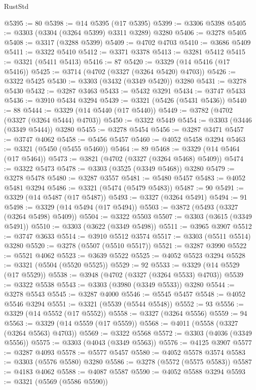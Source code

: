 \begin{lexlean}{RustStd}
\begin{coremodule}
@5395 := 80
@5398 := @14 @5395 (@17 @5395)
@5399 := @3306 @5398
@5405 := @3303 (@3304 (@3264 @5399) @3311 @3289) @3280
@5406 := @3278 @5405
@5408 := @3317 (@3288 @5399)
@5409 := @4702 @4703
@5410 := @3686 @5409
@5411 := @3322 @5410
@5412 := @3371 @3378
@5413 := @3281 @5412
@5415 := @3321 (@5411 @5413)
@5416 := 87
@5420 := @3329 (@14 @5416 (@17 @5416))
@5425 := @3714 (@4702 (@3327 (@3264 @5420) @4703))
@5426 := @3322 @5425
@5430 := @3303 (@3432 (@3349 @5420)) @3280
@5431 := @3278 @5430
@5432 := @3287 @3463
@5433 := @5432 @3291
@5434 := @3747 @5433
@5436 := @3910 @5434 @3294
@5439 := @3321 (@5426 (@5431 @5436))
@5440 := 88
@5444 := @3329 (@14 @5440 (@17 @5440))
@5449 := @3782 (@4702 (@3327 (@3264 @5444) @4703))
@5450 := @3322 @5449
@5454 := @3303 (@3446 (@3349 @5444)) @3280
@5455 := @3278 @5454
@5456 := @3287 @3471
@5457 := @3747 @4062
@5458 := @5456 @5457
@5460 := @4052 @5458 @3294
@5463 := @3321 (@5450 (@5455 @5460))
@5464 := 89
@5468 := @3329 (@14 @5464 (@17 @5464))
@5473 := @3821 (@4702 (@3327 (@3264 @5468) @5409))
@5474 := @3322 @5473
@5478 := @3303 (@3525 (@3349 @5468)) @3280
@5479 := @3278 @5478
@5480 := @3287 @3557
@5481 := @5480 @5457
@5483 := @4052 @5481 @3294
@5486 := @3321 (@5474 (@5479 @5483))
@5487 := 90
@5491 := @3329 (@14 @5487 (@17 @5487))
@5493 := @3327 (@3264 @5491)
@5494 := 91
@5498 := @3329 (@14 @5494 (@17 @5494))
@5503 := @3872 (@5493 (@3327 (@3264 @5498) @5409))
@5504 := @3322 @5503
@5507 := @3303 (@3615 (@3349 @5491))
@5510 := @3303 (@3622 (@3349 @5498))
@5511 := @3965 @3907
@5512 := @3747 @3633
@5514 := @3910 @5512 @3574
@5517 := @3303 (@5511 @5514) @3280
@5520 := @3278 (@5507 (@5510 @5517))
@5521 := @3287 @3990
@5522 := @5521 @4062
@5523 := @3639 @5522
@5525 := @4052 @5523 @3294
@5528 := @3321 (@5504 (@5520 @5525))
@5529 := 92
@5533 := @3329 (@14 @5529 (@17 @5529))
@5538 := @3948 (@4702 (@3327 (@3264 @5533) @4703))
@5539 := @3322 @5538
@5543 := @3303 (@3980 (@3349 @5533)) @3280
@5544 := @3278 @5543
@5545 := @3287 @4000
@5546 := @5545 @5457
@5548 := @4052 @5546 @3294
@5551 := @3321 (@5539 (@5544 @5548))
@5552 := 93
@5556 := @3329 (@14 @5552 (@17 @5552))
@5558 := @3327 (@3264 @5556)
@5559 := 94
@5563 := @3329 (@14 @5559 (@17 @5559))
@5568 := @4011 (@5558 (@3327 (@3264 @5563) @4703))
@5569 := @3322 @5568
@5572 := @3303 (@4036 (@3349 @5556))
@5575 := @3303 (@4043 (@3349 @5563))
@5576 := @4125 @3907
@5577 := @3287 @4093
@5578 := @5577 @5457
@5580 := @4052 @5578 @3574
@5583 := @3303 (@5576 @5580) @3280
@5586 := @3278 (@5572 (@5575 @5583))
@5587 := @4183 @4062
@5588 := @4087 @5587
@5590 := @4052 @5588 @3294
@5593 := @3321 (@5569 (@5586 @5590))

\end{coremodule}
\end{lexlean}
